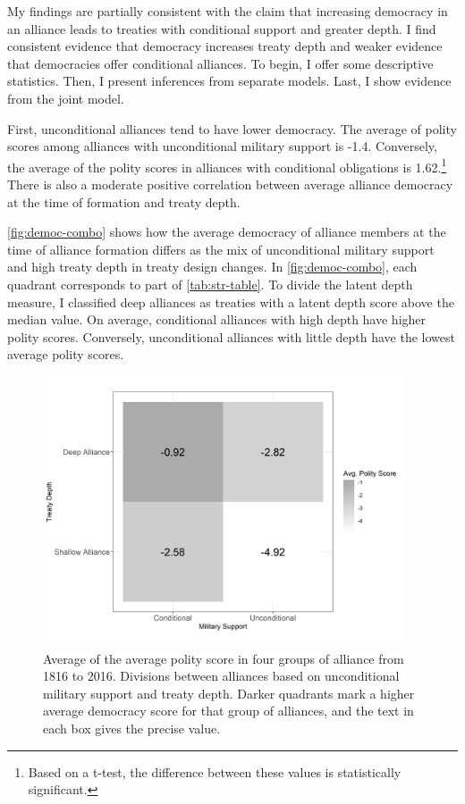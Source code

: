 \documentclass[12pt]{article}
\begin{document}
My findings are partially consistent with the claim that increasing democracy in an alliance leads to treaties with conditional support and greater depth. 
I find consistent evidence that democracy increases treaty depth and weaker evidence that democracies offer conditional alliances. 
To begin, I offer some descriptive statistics.
Then, I present inferences from separate models. 
Last, I show evidence from the joint model. 


First, unconditional alliances tend to have lower democracy. 
The average of polity scores among alliances with unconditional military support is -1.4. 
Conversely, the average of the polity scores in alliances with conditional obligations is 1.62.\footnote{Based on a t-test, the difference between these values is statistically significant.} 
There is also a moderate positive correlation between average alliance democracy at the time of formation and treaty depth. 


\autoref{fig:democ-combo} shows how the average democracy of alliance members at the time of alliance formation differs as the mix of unconditional military support and high treaty depth in treaty design changes.
In \autoref{fig:democ-combo}, each quadrant corresponds to part of \autoref{tab:str-table}.
To divide the latent depth measure, I classified deep alliances as treaties with a latent depth score above the median value. 
On average, conditional alliances with high depth have higher polity scores. 
Conversely, unconditional alliances with little depth have the lowest average polity scores. 


\begin{figure}[hbtp]
\centering
\includegraphics[width=0.95\textwidth]{../figures/democ-combo.png}
\caption{Average of the average polity score in four groups of alliance from 1816 to 2016. Divisions between alliances based on unconditional military support and treaty depth. Darker quadrants mark a higher average democracy score for that group of alliances, and the text in each box gives the precise value. }
\label{fig:democ-combo}
\end{figure}
\end{document}
